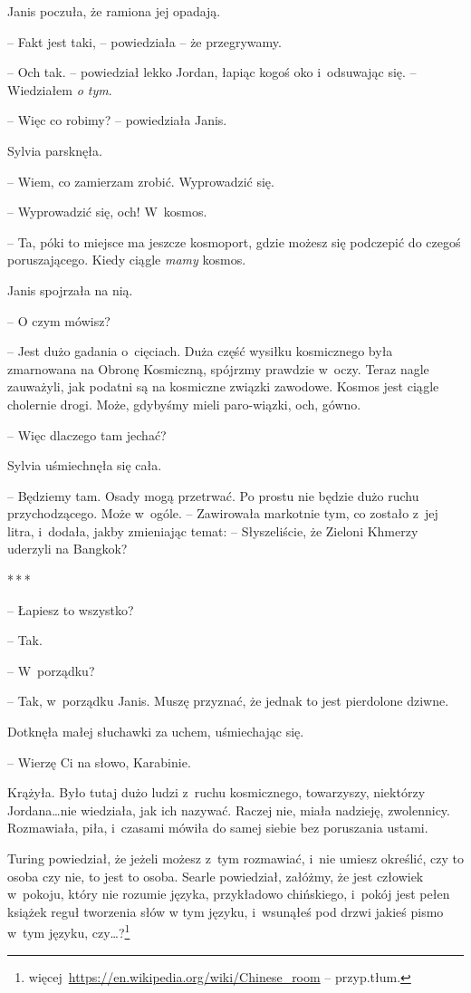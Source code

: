 \documentclass[oneside,polish,11pt,sfheadings]{mwbk}
\newcommand{\threeast}{\bigskip\par\centerline{*\,*\,*}\medskip\par}%
\begin{document}
Janis poczuła, że ramiona jej opadają. 

-- Fakt jest taki, -- powiedziała -- że przegrywamy.

-- Och tak. -- powiedział lekko Jordan, łapiąc kogoś oko i~odsuwając się.
-- Wiedziałem \emph{o tym}.

-- Więc co robimy? -- powiedziała Janis.

Sylvia parsknęła. 

-- Wiem, co zamierzam zrobić. Wyprowadzić się.

-- Wyprowadzić się, och! W~kosmos.

-- Ta, póki to miejsce ma jeszcze kosmoport, gdzie możesz się podczepić
do czegoś poruszającego. Kiedy ciągle \emph{mamy }kosmos.

Janis spojrzała na nią. 

-- O czym mówisz?

-- Jest dużo gadania o~cięciach. Duża część wysiłku kosmicznego była
zmarnowana na Obronę Kosmiczną, spójrzmy prawdzie w~oczy. Teraz nagle
zauważyli, jak podatni są na kosmiczne związki zawodowe. Kosmos jest
ciągle cholernie drogi. Może, gdybyśmy mieli paro-wiązki, och, gówno.

-- Więc dlaczego tam jechać?

Sylvia uśmiechnęła się cała. 

-- Będziemy tam. Osady mogą przetrwać. Po
prostu nie będzie dużo ruchu przychodzącego. Może w~ogóle. -- Zawirowała
markotnie tym, co zostało z~jej litra, i~dodała, jakby zmieniając temat:
-- Słyszeliście, że Zieloni Khmerzy uderzyli na Bangkok?
  \threeast 

-- Łapiesz to wszystko?

-- Tak.

-- W~porządku?

-- Tak, w~porządku Janis. Muszę przyznać, że jednak to jest pierdolone
dziwne.

Dotknęła małej słuchawki za uchem, uśmiechając się.

-- Wierzę Ci na słowo, Karabinie.

Krążyła. Było tutaj dużo ludzi z~ruchu kosmicznego, towarzyszy,
niektórzy Jordana\ldots nie wiedziała, jak ich nazywać. Raczej nie, miała
nadzieję, zwolennicy. Rozmawiała, piła, i~czasami mówiła do samej siebie
bez poruszania ustami.

Turing powiedział, że jeżeli możesz z~tym rozmawiać, i~nie umiesz
określić, czy to osoba czy nie, to jest to osoba. Searle powiedział,
załóżmy, że jest człowiek w~pokoju, który nie rozumie języka,
przykładowo chińskiego, i~pokój jest pełen książek reguł tworzenia słów
w tym języku, i~wsunąłeś pod drzwi jakieś pismo w~tym języku, czy\ldots?\footnote{więcej~\url{https://en.wikipedia.org/wiki/Chinese\_room}
-- przyp.tłum.}
\end{document}
